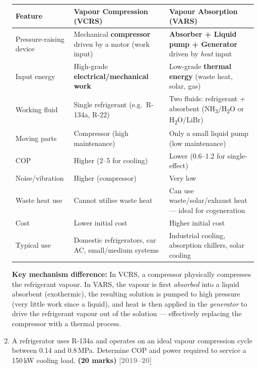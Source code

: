 \documentclass[12pt,a3paper]{article}
\newcommand{\yr}[1]{\hfill\textcolor{gray}{\small\textbf{[#1]}}}
\newcommand{\mk}[1]{\textcolor{orange!70!black}{\small\textbf{(#1 marks)}}}
\begin{document}
\begin{enumerate}
\begin{tcolorbox}[enhanced,breakable,ansbox,colback=cC!4,colframe=cC,
  boxrule=0.8pt,arc=5pt,
  title={\textbf{Answer}},fonttitle=\bfseries\color{white},colbacktitle=cC]
\begin{center}
\small
\begin{tabular}{@{}p{3.2cm}p{4.8cm}p{4.8cm}@{}}
\toprule
\textbf{Feature} & \textbf{Vapour Compression (VCRS)} & \textbf{Vapour Absorption (VARS)} \\
\midrule
Pressure-raising device
  & Mechanical \textbf{compressor} driven by a motor (work input)
  & \textbf{Absorber + Liquid pump + Generator} driven by \emph{heat} input \\[4pt]
Input energy
  & High-grade \textbf{electrical/mechanical work}
  & Low-grade \textbf{thermal energy} (waste heat, solar, gas) \\[4pt]
Working fluid
  & Single refrigerant (e.g.\ R-134a, R-22)
  & Two fluids: refrigerant + absorbent (NH\textsubscript{3}/H\textsubscript{2}O or H\textsubscript{2}O/LiBr) \\[4pt]
Moving parts
  & Compressor (high maintenance)
  & Only a small liquid pump (low maintenance) \\[4pt]
COP
  & Higher (2--5 for cooling)
  & Lower (0.6--1.2 for single-effect) \\[4pt]
Noise/vibration
  & Higher (compressor)
  & Very low \\[4pt]
Waste heat use
  & Cannot utilise waste heat
  & Can use waste/solar/exhaust heat — ideal for cogeneration \\[4pt]
Cost
  & Lower initial cost
  & Higher initial cost \\[4pt]
Typical use
  & Domestic refrigerators, car AC, small/medium systems
  & Industrial cooling, absorption chillers, solar cooling \\
\bottomrule
\end{tabular}
\end{center}

\textbf{Key mechanism difference:}
In VCRS, a compressor physically compresses the refrigerant vapour.
In VARS, the vapour is first \emph{absorbed} into a liquid absorbent
(exothermic), the resulting solution is pumped to high pressure (very little
work since a liquid), and heat is then applied in the \emph{generator} to
drive the refrigerant vapour out of the solution — effectively replacing the
compressor with a thermal process.

\end{tcolorbox}

\item \label{qlabel:A3-Q6}
A refrigerator uses R-134a and operates on an ideal vapour compression cycle between 0.14 and 0.8\,MPa. Determine COP and power required to service a 150\,kW cooling load. \mk{20}
\yr{2019--20}



\end{enumerate}
\end{document}
